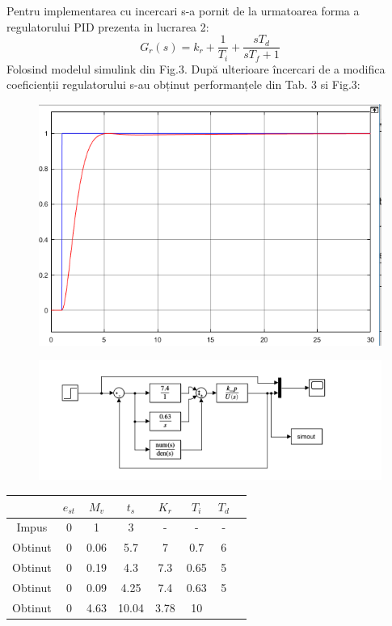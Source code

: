 \documentclass[11pt]{article}
\newcommand{\EqRow}{\vspace{1.5mm}}
\begin{document}
Pentru implementarea cu incercari s-a pornit de la urmatoarea forma a regulatorului PID prezenta in lucrarea 2:
\begin{equation} 
G_r(s)=k_r+\frac{1}{T_i}+\frac{sT_d}{sT_f+1}
\end{equation}
Folosind modelul simulink din Fig.3.
După ulterioare încercari de a modifica coeficienții regulatorului s-au obținut performanțele din Tab. 3 si Fig.3:
\EqRow
\begin{figure}[H]
	\centering
	\begin{minipage}{.5\textwidth}
		\centering
		\includegraphics[width=.9\linewidth]{incercari.png}
		\label{fig:test2}
	\end{minipage}%
	\begin{minipage}{.5\textwidth}
		\centering
		\includegraphics[width=1.4\linewidth]{sim_incercari.png}
		\label{fig:test2}
	\end{minipage}
\end{figure}
\begin{center}
	\begin{tabular}{|c|c|c|c|c|c|c|c|}
		\hline
		&$e_{st}$&$M_v$&$t_s$&$K_r$&$T_i$&$T_d$\\
		\hline
		Impus&0&1&3&-&-&-\\
		\hline
		Obtinut&0&0.06&5.7&7&0.7&6\\
		Obtinut&0&0.19&4.3&7.3&0.65&5\\
		Obtinut&0&0.09&4.25&7.4&0.63&5\\
		Obtinut&0&4.63&10.04&3.78&10&\\
		\hline
	\end{tabular}
\end{center}
\newpage
\end{document}
